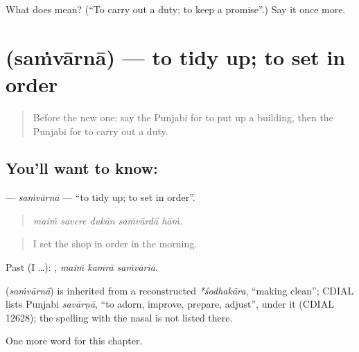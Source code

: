 \begin{tcolorbox}[breakable,colback=teal!4,colframe=teal!35!black,title={Before you move on}]
What does  mean? (\textquotedblleft{}To carry out a duty; to keep a promise\textquotedblright{}.) Say it once more.
\end{tcolorbox}
\section[\texorpdfstring{\pa{ਸੰਵਾਰਨਾ} (saṁvārnā)}{ਸੰਵਾਰਨਾ (saṁvārnā)}]{ (saṁvārnā) — to tidy up; to set in order}

\label{lesson:PA-C363-samvarna}



\begin{quote}
Before the new one: say the Punjabi for to put up a building, then the Punjabi for to carry out a duty.
\end{quote}

\subsection*{You'll want to know: }
\textbf{} — \emph{saṁvārnā} — \textquotedblleft{}to tidy up; to set in order\textquotedblright{}.

\begin{quote}
    
\end{quote}

\begin{quote}
\emph{maiṁ savere dukān saṁvārdā hāṁ.}
\end{quote}

\begin{quote}
I set the shop in order in the morning.
\end{quote}

Past (I …):   , \emph{maiṁ kamrā saṁvāriā}.

\begin{cousinweb}
\textbf{} (\emph{saṁvārnā}) is inherited from a reconstructed \emph{*śodhakāra}, \textquotedblleft{}making clean\textquotedblright{}; CDIAL lists Punjabi \emph{savārṇā}, \textquotedblleft{}to adorn, improve, prepare, adjust\textquotedblright{}, under it (CDIAL 12628); the spelling with the nasal is not listed there.
\end{cousinweb}

\begin{grammarlens}[title={What you've built}]
One more word for this chapter.
\end{grammarlens}

